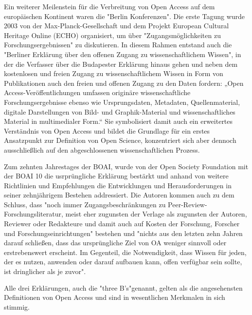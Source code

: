 \begin{enumerate}
Ein weiterer Meilenstein für die Verbreitung von Open Access auf dem europäischen Kontinent waren die "Berlin Konferenzen"\cite{CREATe_2014}. Die erste Tagung wurde 2003 von der Max-Planck-Gesellschaft und dem Projekt European Cultural Heritage Online (ECHO) organisiert, um über "Zugangsmöglichkeiten zu Forschungsergebnissen" zu diskutieren. In diesem Rahmen entstand auch die "Berliner Erklärung über den offenen Zugang zu wissenschaftlichem Wissen"\cite{berliner_erklaerung_2003}, in der die Verfasser über die Budapester Erklärung hinaus gehen und neben dem kostenlosen und freien Zugang zu wissenschaftlichem Wissen in Form von Publikationen auch den freien und offenen Zugang zu den Daten fordern: „Open Access-Veröffentlichungen umfassen originäre wissenschaftliche Forschungsergebnisse ebenso wie Ursprungsdaten, Metadaten, Quellenmaterial, digitale Darstellungen von Bild- und Graphik-Material und wissenschaftliches Material in multimedialer Form.“\cite{berliner_erklaerung_2003} Sie symbolisiert damit auch ein erweitertes Verständnis von Open Access und bildet die Grundlage für ein erstes Ansatzpunkt zur Definition von Open Science, konzentriert sich aber dennoch ausschließlich auf den abgeschlossenen wissenschaftlichen Prozess\cite{suchen}.

\end{enumerate}



Zum zehnten Jahrestages der BOAI, wurde von der Open Society Foundation mit der BOAI 10 die usrprüngliche Erklärung bestärkt und anhand von weitere Richtlinien und Empfehlungen die Entwicklungen und Herausforderungen in seiner zehnjährigem Bestehen addressiert. Die Autoren kommen auch zu dem Schluss, dass  "noch immer Zugangsbeschränkungen zu Peer-Review-Forschungsliteratur, meist eher zugunsten der Verlage als zugunsten der Autoren, Reviewer oder Redakteure und damit auch auf Kosten der Forschung, Forscher und Forschungseinrichtungen" bestehen und "nichts aus den letzten zehn Jahren darauf schließen, dass das ursprüngliche Ziel von OA weniger sinnvoll oder erstrebenswert erscheint. Im Gegenteil, die Notwendigkeit, dass Wissen für jeden, der es nutzen, anwenden oder darauf aufbauen kann, offen verfügbar sein sollte, ist dringlicher als je zuvor".\cite{boai_2012}

Alle drei Erklärungen, auch die "three B's"\cite{suber_2004_praising_oa}genannt, gelten als die angesehensten Definitionen von Open Access und sind in wesentlichen Merkmalen in sich stimmig\cite{albert_2006_open_implications}.

